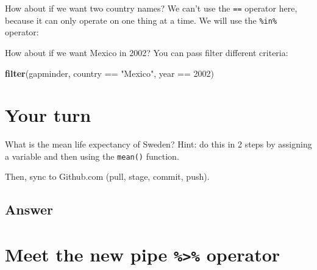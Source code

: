 \documentclass[]{book}
\newenvironment{Shaded}{\begin{snugshade}}{\end{snugshade}}
\newcommand{\KeywordTok}[1]{\textcolor[rgb]{0.13,0.29,0.53}{\textbf{{#1}}}}
\newcommand{\DecValTok}[1]{\textcolor[rgb]{0.00,0.00,0.81}{{#1}}}
\newcommand{\StringTok}[1]{\textcolor[rgb]{0.31,0.60,0.02}{{#1}}}
\newcommand{\NormalTok}[1]{{#1}}
\theoremstyle{definition}
\theoremstyle{definition}
\theoremstyle{definition}
\theoremstyle{remark}
\begin{document}
How about if we want two country names? We can't use the \texttt{==}
operator here, because it can only operate on one thing at a time. We
will use the \texttt{\%in\%} operator:

\begin{Shaded}
\end{Shaded}

How about if we want Mexico in 2002? You can pass filter different
criteria:

\begin{Shaded}
\begin{Highlighting}[]
\KeywordTok{filter}\NormalTok{(gapminder, country ==}\StringTok{ "Mexico"}\NormalTok{, year ==}\StringTok{ }\DecValTok{2002}\NormalTok{)}
\end{Highlighting}
\end{Shaded}

\section{Your turn}\label{your-turn-5}

What is the mean life expectancy of Sweden? Hint: do this in 2 steps by
assigning a variable and then using the \texttt{mean()} function.

Then, sync to Github.com (pull, stage, commit, push).

\subsection{Answer}\label{answer}

\begin{Shaded}
\end{Shaded}

\section{\texorpdfstring{Meet the new pipe \texttt{\%\textgreater{}\%}
operator}{Meet the new pipe \%\textgreater{}\% operator}}\label{meet-the-new-pipe-operator}
\end{document}
